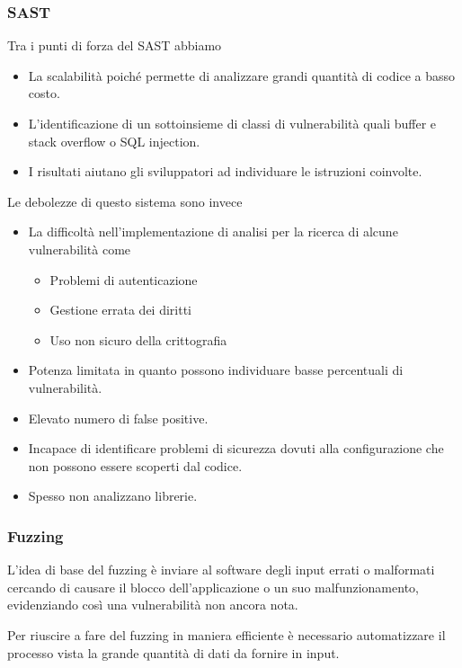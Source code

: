 \subsubsection{SAST}
Tra i punti di forza del SAST abbiamo
\begin{itemize}
	\item La scalabilità poiché permette di analizzare grandi quantità di codice a basso costo.
	\item L'identificazione di un sottoinsieme di classi di vulnerabilità quali buffer e stack overflow o SQL
	      injection.
	\item I risultati aiutano gli sviluppatori ad individuare le istruzioni coinvolte.
\end{itemize}
Le debolezze di questo sistema sono invece
\begin{itemize}
	\item La difficoltà nell'implementazione di analisi per la ricerca di alcune vulnerabilità come
	      \begin{itemize}
		      \item Problemi di autenticazione
		      \item Gestione errata dei diritti
		      \item Uso non sicuro della crittografia
	      \end{itemize}
	\item Potenza limitata in quanto possono individuare basse percentuali di vulnerabilità.
	\item Elevato numero di false positive.
	\item Incapace di identificare problemi di sicurezza dovuti alla configurazione che non possono essere scoperti
	      dal codice.
	\item Spesso non analizzano librerie.
\end{itemize}

\subsubsection{Fuzzing}
L'idea di base del fuzzing è inviare al software degli input errati o malformati cercando di causare il blocco
dell'applicazione o un suo malfunzionamento, evidenziando così una vulnerabilità non ancora nota.

Per riuscire a fare del fuzzing in maniera efficiente è necessario automatizzare il processo vista la grande quantità
di dati da fornire in input.

